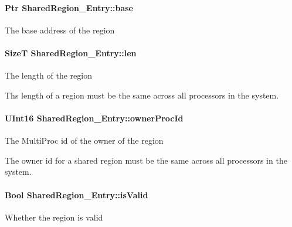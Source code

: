 \paragraph[{base}]{\setlength{\rightskip}{0pt plus 5cm}Ptr Shared\-Region\-\_\-\-Entry\-::base}\label{struct_shared_region___entry_a29bb9c93b43c2dd955f9fecbeb311987}
The base address of the region 
\paragraph[{len}]{\setlength{\rightskip}{0pt plus 5cm}Size\-T Shared\-Region\-\_\-\-Entry\-::len}\label{struct_shared_region___entry_ae71dcd036cf9b3dbfd8be2541322f64e}
The length of the region \begin{DoxyVerb}   Ths length of a region must be the same across all
   processors in the system.\end{DoxyVerb}
\paragraph[{owner\-Proc\-Id}]{\setlength{\rightskip}{0pt plus 5cm}U\-Int16 Shared\-Region\-\_\-\-Entry\-::owner\-Proc\-Id}\label{struct_shared_region___entry_a5b14dd19f62a192f1aa843063d1cbbda}
The Multi\-Proc id of the owner of the region \begin{DoxyVerb}   The owner id for a shared region must be the same across
   all processors in the system.\end{DoxyVerb}
\paragraph[{is\-Valid}]{\setlength{\rightskip}{0pt plus 5cm}Bool Shared\-Region\-\_\-\-Entry\-::is\-Valid}\label{struct_shared_region___entry_ac2de956bb1b21e1372ba61a50c012ef5}
Whether the region is valid 
